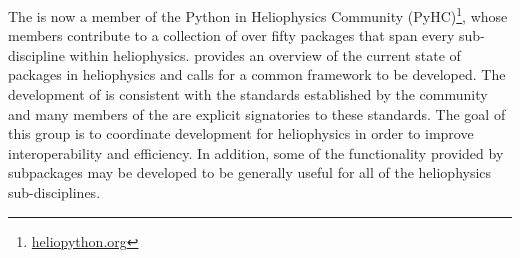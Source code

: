 The \sunpyproj is now a member of the Python in Heliophysics Community (PyHC)\footnote{\url{heliopython.org}}, whose members contribute to a collection of over fifty \python packages that span every sub-discipline within heliophysics.
\citet{snakes} provides an overview of the current state of \python packages in heliophysics and calls for a common framework to be developed.
The development of \sunpypkg is consistent with the standards established by the community \citep{pyhcStandards} and many members of the \sunpyproj are explicit signatories to these standards.
The goal of this group is to coordinate \python development for heliophysics in order to improve interoperability and efficiency.
In addition, some of the functionality provided by \sunpypkg subpackages may be developed to be generally useful for all of the heliophysics sub-disciplines.
